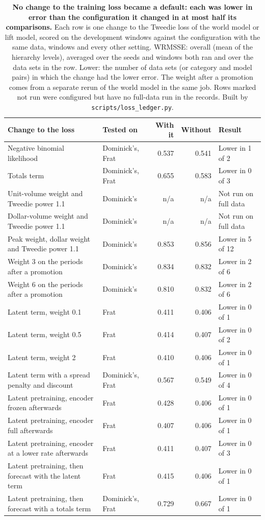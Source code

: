 \begin{table}[t]
\centering
\caption{\textbf{No change to the training loss became a default: each was lower in error than the configuration
it changed in at most half its comparisons.} Each row is one change to the Tweedie loss of the world model or lift
model, scored on the development windows against the configuration with the same data, windows and every other
setting. WRMSSE: overall (mean of the hierarchy levels), averaged over the seeds and windows both ran and over the
data sets in the row. Lower: the number of data sets (or category and model pairs) in which the change had the lower
error. The weight after a promotion comes from a separate rerun of the world model in the same job. Rows marked
not run were configured but have no full-data run in the records. Built by \texttt{scripts/loss\_ledger.py}.}
\label{tab:losses}
\footnotesize
\begin{tabular}{p{}p{}rrl}
\toprule
\textbf{Change to the loss} & \textbf{Tested on} & \textbf{With it} & \textbf{Without} & \textbf{Result} \\
\midrule
Negative binomial likelihood & Dominick's, Frat & 0.537 & 0.541 & Lower in 1 of 2 \\
Totals term & Dominick's, Frat & 0.655 & 0.583 & Lower in 0 of 3 \\
Unit-volume weight and Tweedie power 1.1 & Dominick's & n/a & n/a & Not run on full data \\
Dollar-volume weight and Tweedie power 1.1 & Dominick's & n/a & n/a & Not run on full data \\
Peak weight, dollar weight and Tweedie power 1.1 & Dominick's & 0.853 & 0.856 & Lower in 5 of 12 \\
Weight 3 on the periods after a promotion & Dominick's & 0.834 & 0.832 & Lower in 2 of 6 \\
Weight 6 on the periods after a promotion & Dominick's & 0.810 & 0.832 & Lower in 2 of 6 \\
Latent term, weight 0.1 & Frat & 0.411 & 0.406 & Lower in 0 of 1 \\
Latent term, weight 0.5 & Frat & 0.414 & 0.407 & Lower in 0 of 2 \\
Latent term, weight 2 & Frat & 0.410 & 0.406 & Lower in 0 of 1 \\
Latent term with a spread penalty and discount & Dominick's, Frat & 0.567 & 0.549 & Lower in 0 of 4 \\
Latent pretraining, encoder frozen afterwards & Frat & 0.428 & 0.406 & Lower in 0 of 1 \\
Latent pretraining, encoder full afterwards & Frat & 0.407 & 0.406 & Lower in 0 of 1 \\
Latent pretraining, encoder at a lower rate afterwards & Frat & 0.411 & 0.407 & Lower in 0 of 3 \\
Latent pretraining, then forecast with the latent term & Frat & 0.415 & 0.406 & Lower in 0 of 1 \\
Latent pretraining, then forecast with a totals term & Dominick's, Frat & 0.729 & 0.667 & Lower in 0 of 1 \\
\bottomrule
\end{tabular}
\end{table}
